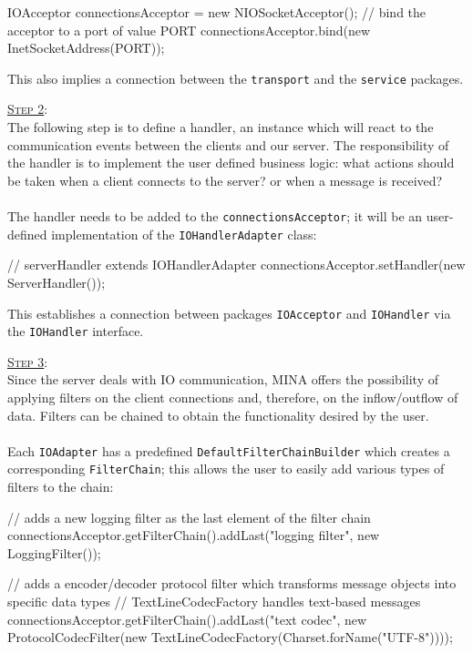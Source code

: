\begin{javashort}
IOAcceptor connectionsAcceptor = new NIOSocketAcceptor();
// bind the acceptor to a port of value PORT
connectionsAcceptor.bind(new InetSocketAddress(PORT));
\end{javashort}
This also implies a connection between the \texttt{transport} and the \texttt{service} packages. 



\underline{\textsc{Step 2}}:\\
The following step is to define a handler, an instance which will react to the communication events between the clients and our server. The responsibility of the handler is to implement the user defined business logic: what actions should be taken when a client connects to the server? or when a message is received?\\\\
The handler needs to be added to the \texttt{connectionsAcceptor}; it will be an user-defined implementation of the \texttt{IOHandlerAdapter} class:

\begin{javashort}
// serverHandler extends IOHandlerAdapter
connectionsAcceptor.setHandler(new ServerHandler());
\end{javashort}
This establishes a connection between packages \texttt{IOAcceptor} and \texttt{IOHandler} via the \texttt{IOHandler} interface.

\underline{\textsc{Step 3}}:\\
Since the server deals with IO communication, MINA offers the possibility of applying filters on the client connections and, therefore, on the inflow/outflow of data. Filters can be chained to obtain the functionality desired by the user.\\\\
Each \texttt{IOAdapter} has a predefined \texttt{DefaultFilterChainBuilder} which creates a corresponding \texttt{FilterChain}; this allows the user to easily add various types of filters to the chain:

\begin{javashort}
// adds a new logging filter as the last element of the filter chain
connectionsAcceptor.getFilterChain().addLast("logging filter", new LoggingFilter());

// adds a encoder/decoder protocol filter which transforms message objects into specific data types
// TextLineCodecFactory handles text-based messages 
connectionsAcceptor.getFilterChain().addLast("text codec", new ProtocolCodecFilter(new TextLineCodecFactory(Charset.forName("UTF-8"))));
\end{javashort}

